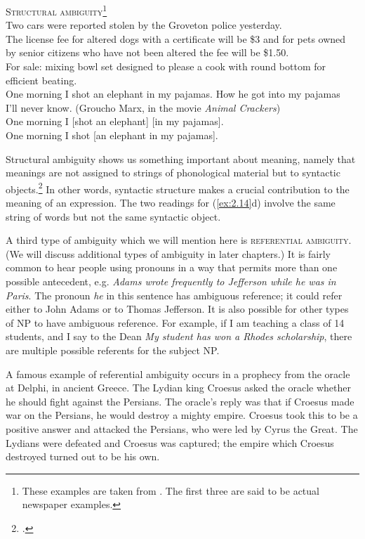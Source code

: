 \ea \label{ex:2.14}
\textsc{Structural ambiguity}\footnote{These examples are taken from \citet[102]{Pinker1994}. The first three are said to be actual newspaper examples.}\\
\ea Two cars were reported stolen by the Groveton police yesterday.\\
\ex The license fee for altered dogs with a certificate will be \$3 and for pets owned\\
  by senior citizens who have not been altered the fee will be \$1.50.\\
\ex For sale: mixing bowl set designed to please a cook with round bottom for\\
  efficient beating.\\
\ex One morning I shot an elephant in my pajamas. How he got into my pajamas\\
  I’ll never know.  (Groucho Marx, in the movie \textit{Animal Crackers})\\
\ex One morning I [shot an elephant] [in my pajamas].\\
\ex One morning I shot [an elephant in my pajamas].
                       \z
\z


Structural ambiguity shows us something important about meaning, namely that meanings are not assigned to strings of phonological material but to syntactic objects.\footnote{\citet[514]{Kennedy2011}.} In other words, syntactic structure makes a crucial contribution to the meaning of an expression. The two readings for (\ref{ex:2.14}d) involve the same string of words but not the same syntactic object.



A third type of ambiguity which we will mention here is \textsc{referential ambiguity}. (We will discuss additional types of ambiguity in later chapters.) It is fairly common to hear people using pronouns in a way that permits more than one possible antecedent, e.g. \textit{Adams wrote frequently to Jefferson while he was in Paris}. The pronoun \textit{he} in this sentence has ambiguous reference; it could refer either to John Adams or to Thomas Jefferson. It is also possible for other types of NP to have ambiguous reference. For example, if I am teaching a class of 14 students, and I say to the Dean \textit{My student has won a Rhodes scholarship}, there are multiple possible referents for the subject NP.



A famous example of referential ambiguity occurs in a prophecy from the oracle at Delphi, in ancient Greece. The Lydian king Croesus asked the oracle whether he should fight against the Persians. The oracle’s reply was that if Croesus made war on the Persians, he would destroy a mighty empire. Croesus took this to be a positive answer and attacked the Persians, who were led by Cyrus the Great. The Lydians were defeated and Croesus was captured; the empire which Croesus destroyed turned out to be his own.


